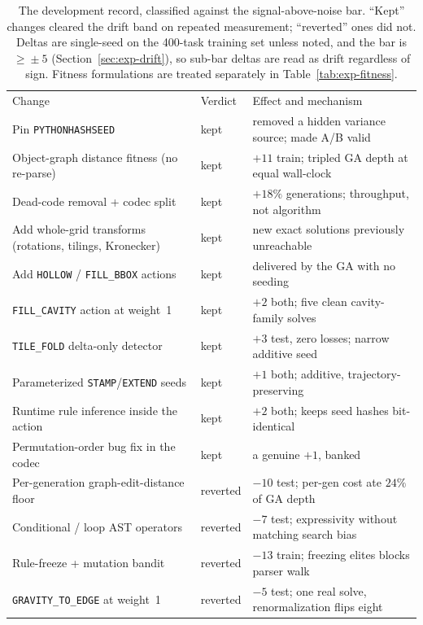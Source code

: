 \begin{table}[htbp]
\centering
\caption{The development record, classified against the signal-above-noise bar. ``Kept''
changes cleared the drift band on repeated measurement; ``reverted'' ones did not. Deltas
are single-seed on the 400-task training set unless noted, and the bar is $\ge\!\pm5$
(Section~\ref{sec:exp-drift}), so sub-bar deltas are read as drift regardless of sign.
Fitness formulations are treated separately in Table~\ref{tab:exp-fitness}.}
\label{tab:app-devlog}
\small
\begin{tabular}{p{5.9cm}p{1.5cm}p{4.8cm}}
\hline\noalign{\smallskip}
Change & Verdict & Effect and mechanism \\
\noalign{\smallskip}\hline\noalign{\smallskip}
Pin \texttt{PYTHONHASHSEED} & kept & removed a hidden variance source; made A/B valid \\
Object-graph distance fitness (no re-parse) & kept & $+11$ train; tripled GA depth at equal wall-clock \\
Dead-code removal + codec split & kept & $+18\%$ generations; throughput, not algorithm \\
Add whole-grid transforms (rotations, tilings, Kronecker) & kept & new exact solutions previously unreachable \\
Add \texttt{HOLLOW} / \texttt{FILL\_BBOX} actions & kept & delivered by the GA with no seeding \\
\texttt{FILL\_CAVITY} action at weight~1 & kept & $+2$ both; five clean cavity-family solves \\
\texttt{TILE\_FOLD} delta-only detector & kept & $+3$ test, zero losses; narrow additive seed \\
Parameterized \texttt{STAMP}/\texttt{EXTEND} seeds & kept & $+1$ both; additive, trajectory-preserving \\
Runtime rule inference inside the action & kept & $+2$ both; keeps seed hashes bit-identical \\
Permutation-order bug fix in the codec & kept & a genuine $+1$, banked \\
Per-generation graph-edit-distance floor & reverted & $-10$ test; per-gen cost ate $24\%$ of GA depth \\
Conditional / loop AST operators & reverted & $-7$ test; expressivity without matching search bias \\
Rule-freeze + mutation bandit & reverted & $-13$ train; freezing elites blocks parser walk \\
\texttt{GRAVITY\_TO\_EDGE} at weight~1 & reverted & $-5$ test; one real solve, renormalization flips eight \\

\end{tabular}
\end{table}
